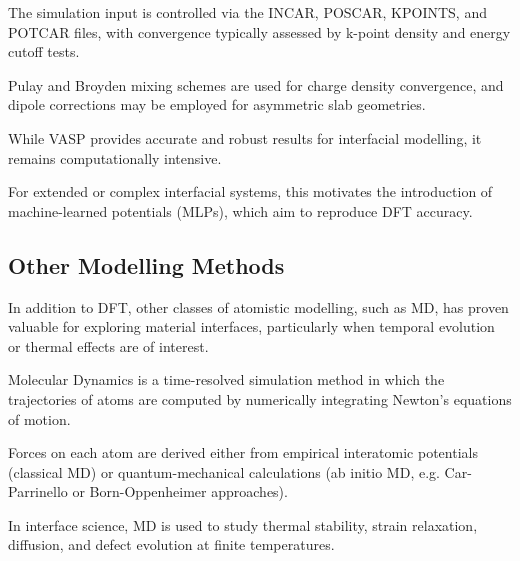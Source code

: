 The simulation input is controlled via the INCAR, POSCAR, KPOINTS, and POTCAR files, with convergence typically assessed
by k-point density and energy cutoff tests.

Pulay and Broyden mixing schemes are used for charge density convergence, and dipole corrections may be employed for
asymmetric slab geometries.










While VASP provides accurate and robust results for interfacial modelling, it remains computationally intensive\cite{Butler2019-ws, Leung2020-tv}.

For extended or complex interfacial systems, this motivates the introduction of machine-learned potentials (MLPs), which
aim to reproduce DFT accuracy\cite{Batzner2022-fd, Owen2024-wp}.


\subsection{Other Modelling Methods}


In addition to DFT, other classes of atomistic modelling, such as MD, has proven valuable for exploring material
interfaces, particularly when temporal evolution or thermal effects are of interest\cite{Khot2025-hh}.


Molecular Dynamics is a time-resolved simulation method in which the trajectories of atoms are computed by numerically
integrating Newton's equations of motion\cite{Batzner2022-fd, Khot2025-hh}.

Forces on each atom are derived either from empirical interatomic potentials (classical MD) or quantum-mechanical
calculations (ab initio MD, e.g. Car-Parrinello or Born-Oppenheimer approaches)\cite{Batzner2022-fd}.

In interface science, MD is used to study thermal stability, strain relaxation, diffusion, and defect evolution at
finite temperatures\cite{Khot2025-hh}.

